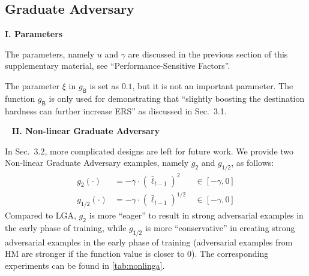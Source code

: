 \subsection{Graduate Adversary}
\label{sec:b3}

\noindent\textbf{I. Parameters}

The parameters, namely $u$ and $\gamma$ are discussed in the previous section
of this supplementary material, see ``Performance-Sensitive Factors''.

The parameter $\xi$ in $g_\mathsf{B}$ is set as $0.1$, but it is not an important parameter.
%
The function $g_\mathsf{B}$ is only used for demonstrating that ``slightly
boosting the destination hardness can further increase ERS'' as discussed
in Sec.~3.1.


~\newline
\noindent\textbf{II. Non-linear Graduate Adversary}

In Sec.~3.2, more complicated designs are left for future work.
%
We provide two Non-linear Graduate Adversary examples, namely
$g_\mathsf{2}$ and $g_\mathsf{1/2}$, as follows:
%
\begin{align}
	g_\mathsf{2}(\cdot)   &= -\gamma \cdot (\bar{\ell}_{t-1})^{2}  &~ \in [-\gamma,0]\\
	g_\mathsf{1/2}(\cdot) &= -\gamma \cdot (\bar{\ell}_{t-1})^{1/2} &~ \in [-\gamma, 0]
\end{align}
%
Compared to LGA, $g_\mathsf{2}$ is more ``eager'' to result in strong adversarial
examples in the early phase of training, while $g_\mathsf{1/2}$ is more ``conservative''
in creating strong adversarial examples in the early phase of training
(adversarial examples from HM are stronger if the function value is closer to $0$).
%
The corresponding experiments can be found in \cref{tab:nonlinga}.

